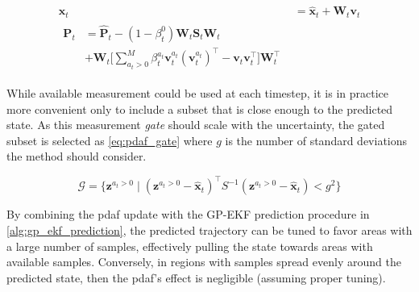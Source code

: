 \begin{subequations}
    \begin{align}
        \boldsymbol{x}_t & = \hat{\boldsymbol{x}}_t + \boldsymbol{W}_t \boldsymbol{v}_t \label{eq:pdaf_moment_mean} \\
        \begin{split}
            \boldsymbol{P}_t &= \hat{\boldsymbol{P}}_t - (1 - \beta_t^{0}) \boldsymbol{W}_t \boldsymbol{S}_t  \boldsymbol{W}_t\\ &+ \boldsymbol{W}_t \big[\sum_{a_t > 0}^M \beta_t^{a_t} \boldsymbol{v}_t^{a_t} (\boldsymbol{v}_t^{a_t})^\intercal - \boldsymbol{v}_t \boldsymbol{v}_t^\intercal \big] \boldsymbol{W}_t^\intercal\label{eq:pdaf_moment_var}
        \end{split}
    \end{align}
\end{subequations}

While available measurement could be used at each timestep, it is in practice more convenient only to include a subset that is close enough to the predicted state. As this measurement \textit{gate} should scale with the uncertainty, the gated subset is selected as \cref{eq:pdaf_gate} where $g$ is the number of standard deviations the method should consider.

\begin{equation} \label{eq:pdaf_gate}
    \mathcal{G} = \big\{ \boldsymbol{z}^{a_t > 0} \; | \; (\boldsymbol{z}^{a_t > 0} - \hat{\boldsymbol{x}}_t)^\intercal S^{-1} (\boldsymbol{z}^{a_t > 0} - \hat{\boldsymbol{x}}_t) < g^2 \big\}
\end{equation}


By combining the \acrshort{pdaf} update with the GP-EKF prediction procedure in \cref{alg:gp_ekf_prediction}, the predicted trajectory can be tuned to favor areas with a large number of samples, effectively pulling the state towards areas with available samples. Conversely, in regions with samples spread evenly around the predicted state, then the \acrshort{pdaf}'s effect is negligible (assuming proper tuning).

